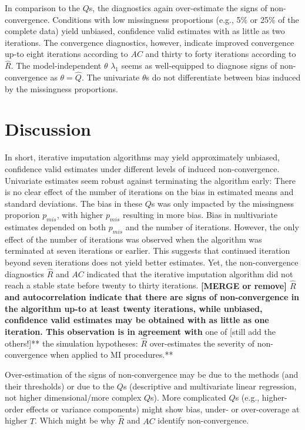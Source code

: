 \documentclass[Royal,times,sageh]{sagej}
\begin{document}
In comparison to the \(Q\)s, the diagnostics again over-estimate the signs of non-convergence. Conditions with low missingness proportions (e.g., 5\% or 25\% of the complete data) yield unbiased, confidence valid estimates with as little as two iterations. The convergence diagnostics, however, indicate improved convergence up-to eight iterations according to \(AC\) and thirty to forty iterations according to \(\widehat{R}\). The model-independent \(\theta\) \(\lambda_1\) seems as well-equipped to diagnose signs of non-convergence as \(\theta=\hat{Q}\). The univariate \(\theta\)s do not differentiate between bias induced by the missingness proportions.

\hypertarget{discussion}{%
\section{Discussion}\label{discussion}}

In short, iterative imputation algorithms may yield approximately unbiased, confidence valid estimates under different levels of induced non-convergence. Univariate estimates seem robust against terminating the algorithm early: There is no clear effect of the number of iterations on the bias in estimated means and standard deviations. The bias in these \(Q\)s was only impacted by the missingness proporion \(p_{mis}\), with higher \(p_{mis}\) resulting in more bias. Bias in multivariate estimates depended on both \(p_{mis}\) and the number of iterations. However, the only effect of the number of iterations was observed when the algorithm was terminated at seven iterations or earlier. This suggests that continued iteration beyond seven iterations does not yield better estimates. Yet, the non-convergence diagnostics \(\widehat{R}\) and \(AC\) indicated that the iterative imputation algorithm did not reach a stable state before twenty to thirty iterations. \textbf{{[}MERGE or remove{]} \(\widehat{R}\) and autocorrelation indicate that there are signs of non-convergence in the algorithm up-to at least twenty iterations, while unbiased, confidence valid estimates may be obtained with as little as one iteration. This observation is in agreement with }one of {[}still add the others!{]}** the simulation hypotheses: \(\widehat{R}\) over-estimates the severity of non-convergence when applied to MI procedures.**

Over-estimation of the signs of non-convergence may be due to the methods (and their thresholds) or due to the \(Q\)s (descriptive and multivariate linear regression, not higher dimensional/more complex \(Q\)s). More complicated \(Q\)s (e.g., higher-order effects or variance components) might show bias, under- or over-coverage at higher \(T\). Which might be why \(\widehat{R}\) and \(AC\) identify non-convergence.
\end{document}
